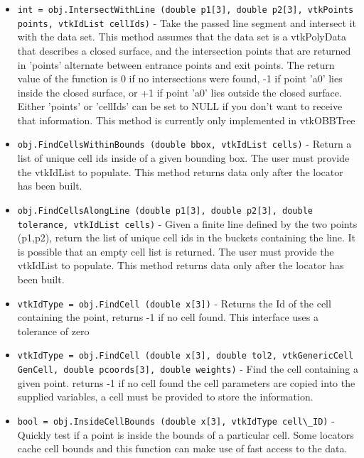 \begin{itemize}
\item  \verb|int = obj.IntersectWithLine (double p1[3], double p2[3], vtkPoints points, vtkIdList cellIds)| -  Take the passed line segment and intersect it with the data set.
 This method assumes that the data set is a vtkPolyData that describes
 a closed surface, and the intersection points that are returned in
 'points' alternate between entrance points and exit points.
 The return value of the function is 0 if no intersections were found,
 -1 if point 'a0' lies inside the closed surface, or +1 if point 'a0'
 lies outside the closed surface.
 Either 'points' or 'cellIds' can be set to NULL if you don't want
 to receive that information. This method is currently only implemented
 in vtkOBBTree

\item  \verb|obj.FindCellsWithinBounds (double bbox, vtkIdList cells)| -  Return a list of unique cell ids inside of a given bounding box. The
 user must provide the vtkIdList to populate. This method returns data
 only after the locator has been built.

\item  \verb|obj.FindCellsAlongLine (double p1[3], double p2[3], double tolerance, vtkIdList cells)| -  Given a finite line defined by the two points (p1,p2), return the list
 of unique cell ids in the buckets containing the line. It is possible
 that an empty cell list is returned. The user must provide the vtkIdList
 to populate. This method returns data only after the locator has been
 built.

\item  \verb|vtkIdType = obj.FindCell (double x[3])| -  Returns the Id of the cell containing the point, 
 returns -1 if no cell found. This interface uses a tolerance of zero

\item  \verb|vtkIdType = obj.FindCell (double x[3], double tol2, vtkGenericCell GenCell, double pcoords[3], double weights)| -  Find the cell containing a given point. returns -1 if no cell found
 the cell parameters are copied into the supplied variables, a cell must
 be provided to store the information.

\item  \verb|bool = obj.InsideCellBounds (double x[3], vtkIdType cell\_ID)| -  Quickly test if a point is inside the bounds of a particular cell.
 Some locators cache cell bounds and this function can make use
 of fast access to the data.

\end{itemize}
